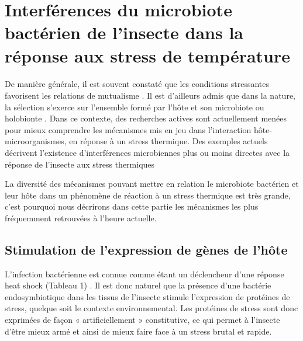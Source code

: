 \section{Interférences du microbiote bactérien de l'insecte dans la réponse aux stress de température} %

\paragraph*{}
De manière générale, il est souvent constaté que les conditions stressantes favorisent les relations de mutualisme \cite{meadows2013}.
Il est d'ailleurs admis que dans la nature, la sélection s'exerce sur l'ensemble formé par l'hôte et son microbiote ou holobionte \cite{rosenberg2008}.
Dans ce contexte, des recherches actives sont actuellement menées pour mieux comprendre les mécanismes mis en jeu dans l’interaction hôte-microorganismes, en réponse à un stress thermique.
Des exemples actuels décrivent l'existence d’interférences microbiennes plus ou moins directes avec la réponse de l'insecte aux stress thermiques

La diversité des mécanismes pouvant mettre en relation le microbiote bactérien et leur hôte dans un phénomène de réaction à un stress thermique est très grande, c'est pourquoi nous décrirons dans cette partie les mécanismes les plus fréquemment retrouvées à l'heure actuelle.

\subsection{Stimulation de l'expression de gènes de l'hôte}

L'infection bactérienne est connue comme étant un déclencheur d'une réponse heat shock (Tableau 1) \cite{sorensen2003}.
Il est donc naturel que la présence d'une bactérie endosymbiotique dans les tissus de l'insecte stimule l'expression de protéines de stress, quelque soit le contexte environnemental.
Les protéines de stress sont donc exprimées de façon « artificiellement » constitutive, ce qui permet à l'insecte d'être mieux armé et ainsi de mieux faire face à un stress brutal et rapide.

